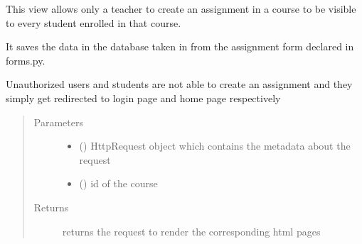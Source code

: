 \documentclass[letterpaper,10pt,english]{sphinxmanual}
\begin{document}
\begin{fulllineitems}
\label{\detokenize{users:users.views.createassignment}}
\sphinxAtStartPar
This view allows only a teacher to create an assignment in a course to be visible to every student enrolled in that course.

\sphinxAtStartPar
It saves the data in the database taken in from the assignment form declared in forms.py.

\sphinxAtStartPar
Unauthorized users and students are not able to create an assignment and they simply get redirected to login page and home page respectively
\begin{quote}\begin{description}
\item[{Parameters}] \leavevmode\begin{itemize}
\item {} 
\sphinxAtStartPar
{} () \textendash{} HttpRequest object which contains the metadata about the request

\item {} 
\sphinxAtStartPar
{} () \textendash{} id of the course

\end{itemize}

\item[{Returns}] \leavevmode
\sphinxAtStartPar
returns the request to render the corresponding html pages

\end{description}\end{quote}

\end{fulllineitems}

\end{document}
